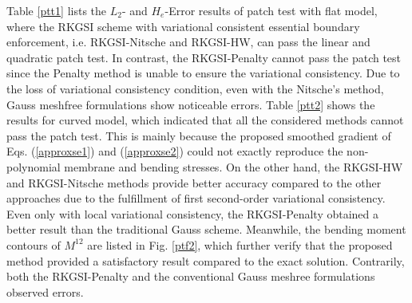 Table \ref{ptt1} lists the $L_2$- and $H_e$-Error results of patch test with flat model, where the RKGSI scheme with variational consistent essential boundary enforcement, i.e. RKGSI-Nitsche and RKGSI-HW, can pass the linear and quadratic patch test. In contrast, the RKGSI-Penalty cannot pass the patch test since the Penalty method is unable to ensure the variational consistency. Due to the loss of variational consistency condition, even with the Nitsche's method, Gauss meshfree formulations show noticeable errors. Table \ref{ptt2} shows the results for curved model, which indicated that all the considered methods cannot pass the patch test. This is mainly because the proposed smoothed gradient of Eqs. (\ref{approxse1}) and (\ref{approxse2}) could not exactly reproduce the non-polynomial membrane and bending stresses. On the other hand, the RKGSI-HW and RKGSI-Nitsche methods provide better accuracy compared to the other approaches due to the fulfillment of first second-order variational consistency. Even only with local variational consistency, the RKGSI-Penalty obtained a better result than the traditional Gauss scheme. Meanwhile, the bending moment contours of $M^{12}$ are listed in Fig. \ref{ptf2}, which further verify that the proposed method provided a satisfactory result compared to the exact solution. Contrarily, both the RKGSI-Penalty and the conventional Gauss meshree formulations observed errors.

